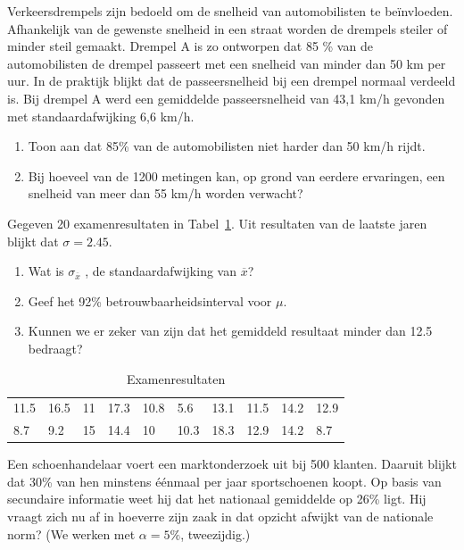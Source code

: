 {\begin{exercise}
  Verkeersdrempels zijn bedoeld om de snelheid van automobilisten te be\"invloeden. Afhankelijk van de gewenste snelheid in een straat worden de drempels steiler of minder steil gemaakt. Drempel A is zo ontworpen dat 85 \% van de automobilisten de drempel passeert met een snelheid van minder dan 50 km per uur. In de praktijk blijkt dat de passeersnelheid bij een drempel normaal verdeeld is. Bij drempel A werd een gemiddelde passeersnelheid van 43,1 km/h gevonden met standaardafwijking 6,6 km/h.
  
  \begin{enumerate}[label=\alph*.]
    \item Toon aan dat 85\% van de automobilisten niet harder dan 50 km/h rijdt.
    \item Bij hoeveel van de 1200 metingen kan, op grond van eerdere ervaringen, een snelheid van meer dan 55 km/h worden verwacht?
  \end{enumerate}
\end{exercise}

\begin{exercise}
  Gegeven 20 examenresultaten in Tabel~\ref{tab:examen}. Uit resultaten van de laatste jaren blijkt dat $\sigma = 2.45$.
  
  \begin{enumerate}[label=\alph*.]
    \item Wat is $\sigma_{\overline{x}}$ , de standaardafwijking van $\overline{x}$?
    \item Geef het 92\% betrouwbaarheidsinterval voor $\mu$.
    \item Kunnen we er zeker van zijn dat het gemiddeld resultaat minder dan 12.5 bedraagt?
  \end{enumerate}
\end{exercise}

\begin{table}
  \centering
  \begin{tabular}{llllllllll}
    11.5 & 16.5 & 11 & 17.3 & 10.8 & 5.6  & 13.1 & 11.5 & 14.2 & 12.9 \\
    8.7  & 9.2  & 15 & 14.4 & 10   & 10.3 & 18.3 & 12.9 & 14.2 & 8.7 
  \end{tabular}
  \caption{Examenresultaten}
  \label{tab:examen}
\end{table}

\begin{exercise}
  Een schoenhandelaar voert een marktonderzoek uit bij 500 klanten. Daaruit blijkt dat 30\% van hen minstens éénmaal per jaar sportschoenen koopt.  Op basis van secundaire informatie weet hij dat het nationaal gemiddelde op 26\% ligt.  Hij vraagt zich nu af in hoeverre zijn zaak in dat opzicht afwijkt van de nationale norm? (We werken met $\alpha= 5\%$, tweezijdig.)
\end{exercise}

}
